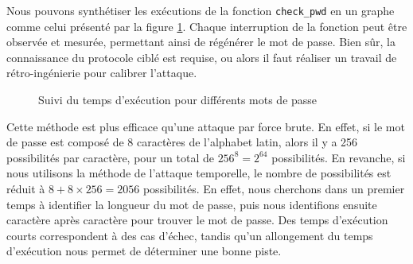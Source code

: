 Nous pouvons synthétiser les exécutions de la fonction \texttt{check\_pwd} en un graphe comme celui présenté par la figure \ref{fig:timing_attack_example}. Chaque interruption de la fonction peut être observée et mesurée, permettant ainsi de régénérer le mot de passe. Bien sûr, la connaissance du protocole ciblé est requise, ou alors il faut réaliser un travail de rétro-ingénierie pour calibrer l'attaque.\medbreak

\begin{figure}[!ht]
    \caption{Suivi du temps d'exécution pour différents mots de passe}
    \label{fig:timing_attack_example}
    \center
\end{figure}

Cette méthode est plus efficace qu'une attaque par force brute. En effet, si le mot de passe est composé de 8 caractères de l'alphabet latin, alors il y a 256 possibilités par caractère, pour un total de $256^8 = 2^{64}$ possibilités. En revanche, si nous utilisons la méthode de l'attaque temporelle, le nombre de possibilités est réduit à $8 + 8 \times 256 = 2056$ possibilités. En effet, nous cherchons dans un premier temps à identifier la longueur du mot de passe, puis nous identifions ensuite caractère après caractère pour trouver le mot de passe. Des temps d'exécution courts correspondent à des cas d'échec, tandis qu'un allongement du temps d'exécution nous permet de déterminer une bonne piste.\medbreak

